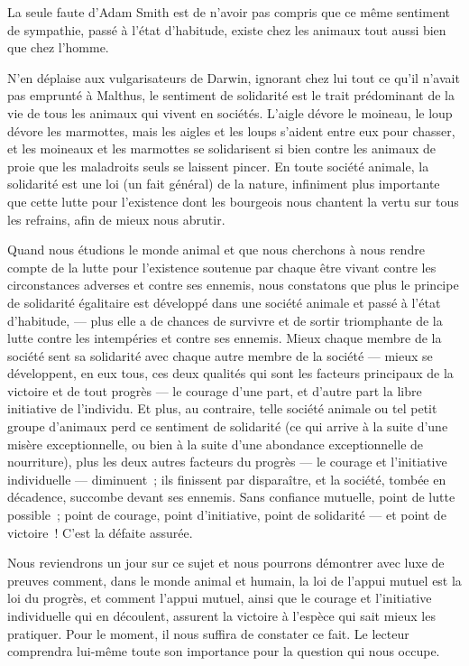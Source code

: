 \documentclass[french,twoside]{book} %
\begin{document}
\bigbreak
\noindent La seule faute d’Adam Smith est de n’avoir pas compris que ce même sentiment de sympathie, passé à l’état d’habitude, existe chez les animaux tout aussi bien que chez l’homme.\par
N’en déplaise aux vulgarisateurs de Darwin, ignorant chez lui tout ce qu’il n’avait pas emprunté à Malthus, le sentiment de solidarité est le trait prédominant de la vie de tous les animaux qui vivent en sociétés. L’aigle dévore le moineau, le loup dévore les marmottes, mais les aigles et les loups s’aident entre eux pour chasser, et les moineaux et les marmottes se solidarisent si bien contre les animaux de proie que les maladroits seuls se laissent pincer. En toute société animale, la solidarité est une loi (un fait général) de la nature, infiniment plus importante que cette lutte pour l’existence dont les bourgeois nous chantent la vertu sur tous les refrains, afin de mieux nous abrutir.\par
Quand nous étudions le monde animal et que nous cherchons à nous rendre compte de la lutte pour l’existence soutenue par chaque être vivant contre les circonstances adverses et contre ses ennemis, nous constatons que plus le principe de solidarité égalitaire est développé dans une société animale et passé à l’état d’habitude, — plus elle a de chances de survivre et de sortir triomphante de la lutte contre les intempéries et contre ses ennemis. Mieux chaque membre de la société sent sa solidarité avec chaque autre membre de la société — mieux se développent, en eux tous, ces deux qualités qui sont les facteurs principaux de la victoire et de tout progrès — le courage d’une part, et d’autre part la libre initiative de l’individu. Et plus, au contraire, telle société animale ou tel petit groupe d’animaux perd ce sentiment de solidarité (ce qui arrive à la suite d’une misère exceptionnelle, ou bien à la suite d’une abondance exceptionnelle de nourriture), plus les deux autres facteurs du progrès — le courage et l’initiative individuelle — diminuent ; ils finissent par disparaître, et la société, tombée en décadence, succombe devant ses ennemis. Sans confiance mutuelle, point de lutte possible ; point de courage, point d’initiative, point de solidarité — et point de victoire ! C’est la défaite assurée.\par
Nous reviendrons un jour sur ce sujet et nous pourrons démontrer avec luxe de preuves comment, dans le monde animal et humain, la  loi de l’appui mutuel est la loi du progrès, et comment l’appui mutuel, ainsi que le courage et l’initiative individuelle qui en découlent, assurent la victoire à l’espèce qui sait mieux les pratiquer. Pour le moment, il nous suffira de constater ce fait. Le lecteur comprendra lui-même toute son importance pour la question qui nous occupe.\par
\end{document}
